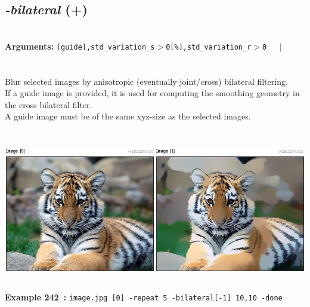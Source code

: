 \documentclass[a4paper,11pt,twoside]{book}
\begin{document}
\subsection{\emph{-bilateral} (+)}\vspace*{-0.5em}
~\\\textbf{Arguments: } 
{\small \texttt{[guide],std\_variation\_s$>$0[\%],std\_variation\_r$>$0}}~~~$|$\\
\\~\\
Blur selected images by anisotropic (eventually joint/cross) bilateral filtering.
~\\If a guide image is provided, it is used for computing the smoothing geometry in the cross bilateral filter.
~\\A guide image must be of the same xyz-size as the selected images.
\begin{center}\includegraphics[keepaspectratio=true,height=7cm,width=\textwidth]{img/gmic_def242.jpg}\\
{\footnotesize \textbf{Example 242~:} \texttt{image.jpg [0] -repeat 5 -bilateral[-1] 10,10 -done}}
\end{center}
\end{document}
